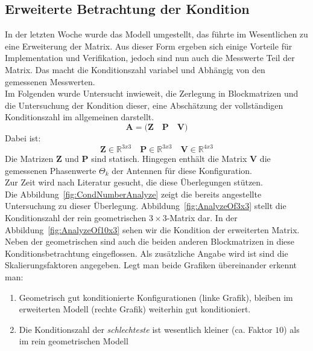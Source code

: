 \documentclass[a4paper,12pt,fleqn]{article}
\begin{document}
\subsection{Erweiterte Betrachtung der Kondition}
In der letzten Woche wurde das Modell umgestellt, das führte im Wesentlichen zu eine Erweiterung der Matrix. Aus dieser Form ergeben sich einige Vorteile für Implementation und Verifikation, jedoch sind nun auch die Messwerte Teil der Matrix. Das macht die Konditionszahl variabel und Abhängig von den gemessenen Messwerten.\\
Im Folgenden wurde Untersucht inwieweit, die Zerlegung in Blockmatrizen und die Untersuchung der Kondition dieser, eine Abschätzung der vollständigen Konditionszahl im allgemeinen darstellt. 
\begin{equation}
\mathbf{A}=\bigg( \mathbf{Z}\quad \mathbf{P}\quad \mathbf{V}\bigg)
\end{equation}
Dabei ist:
\begin{equation}
\mathbf{Z} \in \mathbb{R}^{3x3} \quad \mathbf{P} \in \mathbb{R}^{3x3} \quad \mathbf{V}\in \mathbb{R}^{4x3}
\end{equation}
Die Matrizen $\mathbf{Z}$ und $\mathbf{P}$ sind statisch. Hingegen enthält die Matrix $\mathbf{V}$ die gemessenen Phasenwerte $\Theta_k$ der Antennen für diese Konfiguration. \\
%
Zur Zeit wird nach Literatur gesucht, die diese Überlegungen stützen.\\
%
Die Abbildung~\ref{fig:CondNumberAnalyze} zeigt die bereits angestellte Untersuchung zu dieser Überlegung. Abbildung~\ref{fig:AnalyzeOf3x3} stellt die Konditionszahl der rein geometrischen $3\times3$-Matrix dar. In der Abbildung~\ref{fig:AnalyzeOf10x3} sehen wir die Kondition der erweiterten Matrix. Neben der geometrischen sind auch die beiden anderen Blockmatrizen in diese Konditionsbetrachtung eingeflossen. Als zusätzliche Angabe wird ist sind die Skalierungsfaktoren angegeben. Legt man beide Grafiken übereinander erkennt man:
\begin{enumerate}
\item Geometrisch gut konditionierte Konfigurationen (linke Grafik), bleiben im erweiterten Modell (rechte Grafik) weiterhin gut konditioniert.
\item Die Konditionszahl der \textit{schlechteste} ist wesentlich kleiner (ca. Faktor $10$) als im rein geometrischen Modell
\end{enumerate} 
%
\end{document}
